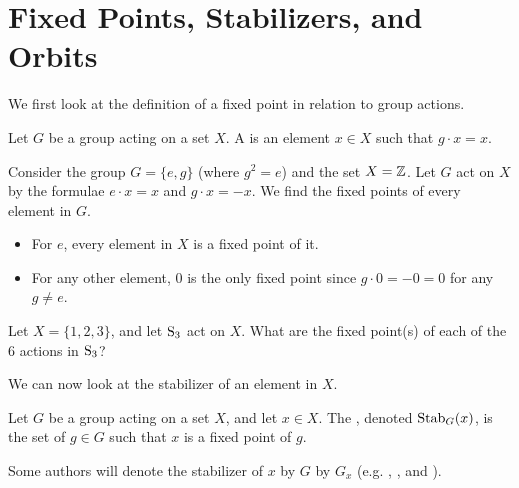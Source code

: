 \section{Fixed Points, Stabilizers, and Orbits}
We first look at the definition of a fixed point in relation to group actions.

\begin{definition}
    Let $G$ be a group acting on a set $X$. A  is an element $x \in X$ such that $g\cdot x = x$.
\end{definition}

\begin{example}
    Consider the group $G = \{e, g\}$ (where $g^2 = e$) and the set $X = \mathbb{Z}$. Let $G$ act on $X$ by the formulae $e\cdot x = x$ and $g\cdot x = -x$. We find the fixed points of every element in $G$.
    \begin{itemize}
        \item For $e$, every element in $X$ is a fixed point of it.
        \item For any other element, 0 is the only fixed point since $g\cdot 0 = -0 = 0$ for any $g \neq e$.
    \end{itemize}
\end{example}

\begin{exercise}
    Let $X = \{1, 2, 3\}$, and let $\mathrm{S}_{3}$ act on $X$. What are the fixed point(s) of each of the 6 actions in $\mathrm{S}_{3}$?
\end{exercise}

We can now look at the stabilizer of an element in $X$.

\begin{definition}
    Let $G$ be a group acting on a set $X$, and let $x \in X$. The , denoted $\mathrm{Stab}_{G}(x)$, is the set of $g \in G$ such that $x$ is a fixed point of $g$.
\end{definition}
\begin{remark}
    Some authors will denote the stabilizer of $x$ by $G$ by $G_x$ (e.g. {\cite[\S 54]{clark_1984}}, {\cite[Definition 10.8]{humphreys_1996}}, and \cite{brilliant_group-actions}).
\end{remark}

